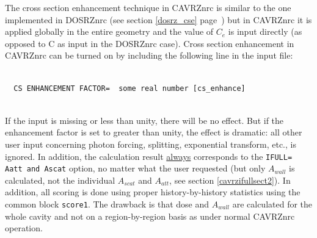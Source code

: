 \documentclass[12pt,twoside]{article}  %
\begin{document}
The cross section enhancement technique in CAVRZnrc is
similar to the one implemented in DOSRZnrc 
(see section \ref{dosrz_cse} page~\pageref{dosrz_cse}) but
in CAVRZnrc it is applied globally in the entire geometry and the value of
$C_e$ is input directly (as opposed to C as input in the DOSRZnrc case).
Cross section enhancement in CAVRZnrc can be turned on by
including the following line in the input file:
\begin{verbatim}
 
  CS ENHANCEMENT FACTOR=  some real number [cs_enhance]
 
\end{verbatim}
If the input is missing or less than unity, there will be
no effect.  But if the enhancement factor is set to greater than unity, the
effect is dramatic: all other user input concerning photon forcing,
splitting, exponential transform, etc., is ignored. In addition,
the calculation result \underline{always} corresponds
to the {\tt IFULL= Aatt and Ascat} option, no matter what the
user requested (but only $A_{wall}$ is calculated,
not the individual $A_{scat}$ and $A_{att}$, see 
section \ref{cavrzifullsect2}). In addition, all scoring 
is done using proper history-by-history statistics using 
the common block {\tt score1}.  The drawback is that dose 
and $A_{wall}$ are calculated for the whole cavity and 
not on a region-by-region basis as under normal 
CAVRZnrc operation. 
\end{document}
